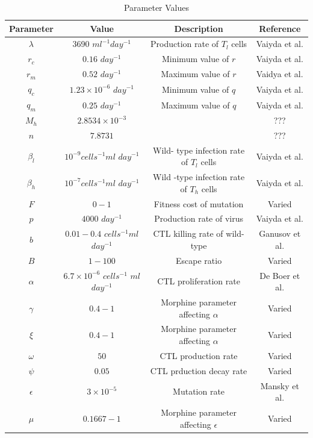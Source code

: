 \documentclass[11pt, oneside]{article}    %
\begin{document}
\begin{table}[H]
\tiny
\centering
\caption{Parameter Values}
\vspace{3mm}
\begin{tabular}{|c|c|c|c|}
\hline
Parameter & Value & Description & Reference\\
\hline
$\lambda$ & 3690 $ml^{-1} day^{-1}$ & Production rate of $T_l$ cells & Vaiyda et al.\\
\hline
$r_c$ & $0.16$ $day^{-1}$& Minimum value of $r$ &  Vaiyda et al.\\
\hline
$r_m$ & $0.52$ $day^{-1}$ & Maximum value of $r$ & Vaidya et al.\\
\hline
$q_c$ & $1.23 \times 10^{-6}$  $day^{-1}$ & Minimum value of $q$ & Vaiyda et al.\\
\hline
$q_m$ & $0.25$ $day^{-1}$ & Maximum value of $q$ & Vaiyda et al.\\
\hline
$M_h$ & $2.8534 \times 10^{-3}$ &    & ???\\
\hline
$n$ & $7.8731$ &    & ???\\
\hline
$\beta_l$ & $10^{-9} cells^{-1}ml$ $day^{-1}$ & Wild- type infection rate of $T_l$ cells & Vaiyda et al.\\
\hline
$\beta_h$ & $10^{-7} cells^{-1}ml$ $day^{-1}$ & Wild -type infection rate of $T_h$ cells & Vaiyda et al. \\
\hline
$F$ & $0 - 1$ & Fitness cost of mutation & Varied\\
\hline
$p$ & $4000$ $day^{-1}$ & Production rate of virus & Vaiyda et al. \\
\hline
$b$ & $0.01-0.4$ $cells^{-1}ml$ $day^{-1}$ & CTL killing rate of wild- type & Ganusov et al.\\
\hline
$B$ & $1-100$ & Escape ratio & Varied\\
\hline 
$\alpha$ & $6.7 \times 10^{-6}$ $cells^{-1}$ $ml$ $day^{-1}$ & CTL proliferation rate & De Boer et al.\\
\hline
$\gamma$ & $0.4-1$ & Morphine parameter affecting $\alpha$ & Varied\\
\hline
$\xi$ & $0.4-1$ & Morphine parameter affecting $\alpha$ & Varied\\
\hline
$\omega$ & $50$ & CTL production rate & Varied\\
\hline
$\psi$ & $0.05$ & CTL prduction decay rate & Varied\\
\hline
$\epsilon$ & $3 \times 10^{-5}$ & Mutation rate & Mansky et al.\\
\hline
$\mu$ & $0.1667-1$ & Morphine parameter affecting $\epsilon$ & Varied\\

\end{tabular}
\end{table}
\end{document}
